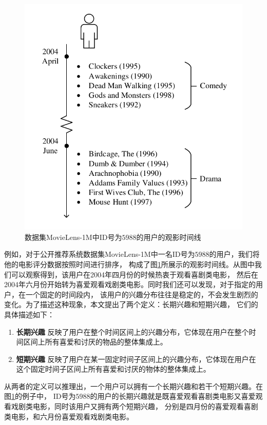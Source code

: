 \begin{figure}[htbp]
\centering
\includegraphics[scale=0.7]{images/example.pdf}
\caption{数据集MovieLens-1M中ID号为$5988$的用户的观影时间线}
\label{fig:example}
\end{figure}

例如，对于公开推荐系统数据集MovieLens-1M中一名ID号为$5988$的用户，我们将他的电影评分数据按照时间进行排序，
构成了图\ref{fig:example}所展示的观影时间线。从图中我们可以观察得到，该用户在2004年四月份的时候热衷于观看喜剧类电影，
然后在2004年六月份开始转为喜爱观看戏剧类电影。同时我们还可以发现，对于指定的用户，在一个固定的时间段内，
该用户的兴趣分布往往是稳定的，不会发生剧烈的变化。为了描述这种现象，本文提出了两个定义：长期兴趣和短期兴趣，
它们的具体描述如下：

\begin{enumerate}
\item \textbf{长期兴趣} 反映了用户在整个时间区间上的兴趣分布，它体现在用户在整个时间区间上所有喜爱和讨厌的物品的整体集成上。
\item \textbf{短期兴趣} 反映了用户在某一固定时间子区间上的兴趣分布，它体现在用户在这个固定时间子区间上所有喜爱和讨厌的物体的整体集成上。
\end{enumerate}

从两者的定义可以推理出，一个用户可以拥有一个长期兴趣和若干个短期兴趣。在图\ref{fig:example}的例子中，
ID号为$5988$的用户的长期兴趣就是既喜爱观看喜剧类电影又喜爱观看戏剧类电影，同时该用户又拥有两个短期兴趣，
分别是四月份的喜爱观看喜剧类电影，和六月份喜爱观看戏剧类电影。

